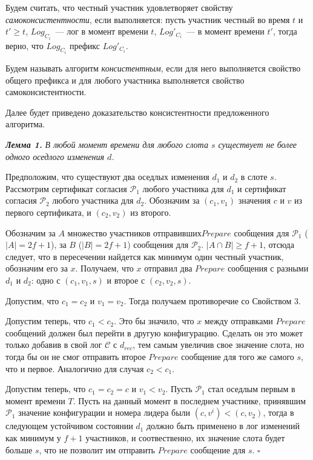 Будем считать, что честный участник удовлетворяет свойству \textit{самоконсистентности}, если выполняется: пусть участник честный во время $t$ и $t' \ge t$, $Log_{C_i}$~--- лог в момент времени $t$, $Log'_{C_i}$~--- в момент времени $t'$, тогда верно, что $Log_{C_i}$ префикс $Log'_{C_i}$.

Будем называть алгоритм \textit{консистентным}, если для него выполняется свойство общего префикса и для любого участника выполняется свойство самоконсистентности.
 
Далее будет приведено доказательство консистентности предложенного алгоритма.

\textbf{\textit{Лемма 1.}} \textit{В любой момент времени для любого слота $s$ существует не более одного оседлого изменения $d$.}

Предположим, что существуют два оседлых изменения $d_1$ и $d_2$ в слоте $s$. Рассмотрим сертификат согласия $\mathcal{P}_1$ любого участника для $d_1$ и сертификат согласия $\mathcal{P}_2$ любого участника для $d_2$. Обозначим за $(c_1, v_1)$ значения $c$ и $v$ из первого сертификата, и $(c_2, v_2)$ из второго.

Обозначим за $A$ множество участников отправивших$Prepare$ сообщения для  $\mathcal{P}_1$ ($|A|=2f+1$), за $B$ ($|B|=2f+1$) сообщения для $\mathcal{P}_2$. $|A \cap B| \ge f+1$, отсюда следует, что в пересечении найдется как минимум один честный участник,  обозначим его за $x$. Получаем, что $x$ отправил два $Prepare$ сообщения с разными $d_1$ и $d_2$: одно с $(c_1, v_1, s)$ и второе с $(c_2, v_2, s)$.

Допустим, что $c_1 = c_2$ и  $v_1 = v_2$. Тогда получаем противоречие со Свойством 3.

Допустим теперь, что $c_1 < c_2$. Это бы значило, что $x$ между отправками $Prepare$ сообщений должен был перейти в другую конфигурацию. Сделать он это может только добавив в свой лог $\mathcal{C}$ с $d_{rec}$, тем самым увеличив свое значение слота, но тогда бы он не смог отправить второе $Prepare$ сообщение для того же самого $s$, что и первое. Аналогично для случая $c_2 < c_1$.

Допустим теперь, что $c_1=c_2=c$ и $v_1 < v_2$. Пусть $\mathcal{P}_1$ стал оседлым первым в момент времени  $T$. Пусть на данный момент в последнем участнике, принявшим $\mathcal{P}_1$ значение конфигурации и номера лидера были $(c, v^i) < (c, v_2)$, тогда в следующем устойчивом состоянии $d_1$ должно быть применено в лог изменений как минимум у $f+1$ участников, и соотвественно, их значение слота будет больше $s$, что не позволит им отправить $Prepare$ сообщение для $s$. $\square$
\vspace{10pt}


